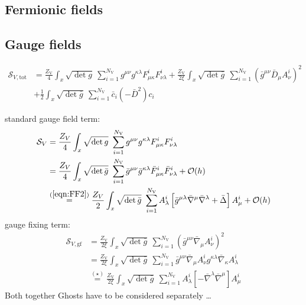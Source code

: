 \subsection{Fermionic  fields}

\subsection{Gauge fields}
\begin{align}
	\mathcal{S}_{V, \mathrm{tot}} &= \frac{Z_{\text{V}}}{4}\int_x \sqrt{\operatorname{det}g} \ \sum\limits_{i=1}^{N_{\text{V}}} g^{\mu\nu}g^{\kappa\lambda}F^{i}_{\mu\kappa}F^{i}_{\nu\lambda}  
		+ \frac{Z_{\text{V}}}{2\xi}\int_x \sqrt{\operatorname{det}\bar{g}} \ \sum\limits_{i=1}^{N_{\text{V}}} \left(\bar{g}^{\mu\nu}\bar{D}_{\mu}A_{\nu}^{i}\right)^2  \nonumber\\
		&+ \frac{1}{2}\int_x \sqrt{\operatorname{det}\bar{g}} \ \sum\limits_{i=1}^{N_{\text{V}}} \bar{c}_i(-\bar{D}^2)c_i 
\end{align}



standard gauge field term:
\begin{align}
\mathcal{S}_{V} &=  \frac{Z_V}{4}\int_x \sqrt{\operatorname{det}g} \ \sum\limits_{i=1}^{N_{\text{V}}} g^{\mu\nu}g^{\kappa\lambda}F^{i}_{\mu\kappa}F^{i}_{\nu\lambda} \nonumber \\
&=  \frac{Z_{V}}{4}\int_x \sqrt{\operatorname{det}\bar{g}} \ \sum\limits_{i=1}^{N_{\text{V}}} \bar{g}^{\mu\nu}\bar{g}^{\kappa\lambda}\bar{F}^{i}_{\mu\kappa}\bar{F}^{i}_{\nu\lambda} + \mathcal{O}(h) \\
&\overset{(\ref{eqn:FF2})}{=} \frac{Z_{V}}{2}\int_x \sqrt{\operatorname{det}\bar{g}} \ \sum\limits_{i=1}^{N_{\text{V}}} A_{\lambda}^{i}\left[ \bar{g}^{\mu\lambda}\bar{\nabla}^{\mu}\bar{\nabla}^{\lambda} + \bar{\Delta}\right]A_{\mu}^{i} + \mathcal{O}(h) \nonumber
\end{align}
gauge fixing term:
\begin{align}
	\mathcal{S}_{V, \mathrm{gf}} &= \frac{Z_{\text{V}}}{2\xi}\int_x \sqrt{\operatorname{det}\bar{g}} \ \sum\limits_{i=1}^{N_{\text{V}}} \left(\bar{g}^{\mu\nu}\bar{\nabla}_{\mu}A_{\nu}^{i}\right)^2  \nonumber\\
	&= \frac{Z_{\text{V}}}{2\xi}\int_x \sqrt{\operatorname{det}\bar{g}} \ \sum\limits_{i=1}^{N_{\text{V}}} \bar{g}^{\mu\nu}\bar{\nabla}_{\mu}A_{\nu}^{i}g^{\kappa\lambda}\bar{\nabla}_{\kappa}A_{\lambda}^{i} \\
	&\overset{(\star)}{=} \frac{Z_{\text{V}}}{2\xi}\int_x \sqrt{\operatorname{det}\bar{g}} \ \sum\limits_{i=1}^{N_{\text{V}}} A_{\lambda}^{i}\left[-\bar{\nabla}^{\lambda}\bar{\nabla}^{\mu}\right]A_{\mu}^{i} \nonumber
\end{align}
Both together 
Ghosts have to be considered separately \dots



